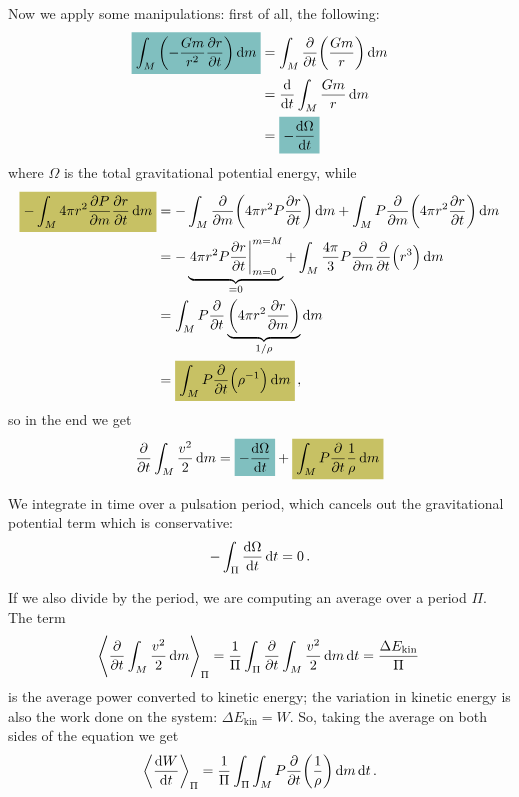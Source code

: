 \documentclass[main.tex]{subfiles}
\begin{document}
Now we apply some manipulations: first of all, the following: 
%
\begin{align}
\hlc{teal}{\int_{M} \qty(- \frac{Gm}{r^2} \pdv{r}{t}) \dd{m}} &= 
\int_{M} \pdv{}{t} \qty(\frac{Gm}{r}) \dd{m}  \\
&= \dv{}{t} \int_{M} \frac{Gm}{r} \dd{m}  \\
&= \hlc{teal}{- \dv{\Omega }{t}}
\,
\end{align}
%
where \(\Omega \) is the total gravitational potential energy, while 
%
\begin{align}
\hlc{olive}{- \int_{M} 4 \pi r^2 \pdv{P}{m} \pdv{r}{t} \dd{m}} &= 
- \int_{M} \pdv{}{m} \qty(4 \pi r^2 P \pdv{r}{t}) \dd{m}
+ \int_{M} P \pdv{}{m} \qty(4 \pi r^2 \pdv{r}{t}) \dd{m}  \\
&= - \underbrace{\eval{4 \pi r^2 P \pdv{r}{t}}_{m=0}^{m=M}}_{=0}
+ \int_{M} \frac{4 \pi }{3} P \pdv{}{m} \pdv{}{t} \qty(r^3) \dd{m}  \\
&= \int_{M} P \pdv{}{t} \underbrace{\qty(4 \pi r^2 \pdv{r}{m})}_{1 / \rho } \dd{m}  \\
&= \hlc{olive}{\int_{M} P \pdv{}{t} \qty(\rho^{-1}) \dd{m}}
\,,
\end{align}
%
so in the end we get 
%
\begin{equation}
\pdv{}{t} \int_M \frac{v^2}{2} \dd{m} =
\hlc{teal}{- \dv{\Omega}{t} } +
\hlc{olive}{\int_M P \pdv{}{t} \frac{1}{\rho} \dd{m}}
\end{equation}

We integrate in time over a pulsation period, which cancels out the gravitational potential term which is conservative: 
%
\begin{align}
-\int_{\Pi } \dv{\Omega }{t} \dd{t} = 0
\,.
\end{align}

If we also divide by the period, we are computing an average over a period \(\Pi \). The term 
%
\begin{align}
\expval{\pdv{}{t} \int_{M} \frac{v^2}{2} \dd{m}}_{\Pi }
= \frac{1}{\Pi } \int_{\Pi } \pdv{}{t} \int_{M} \frac{v^2}{2} \dd{m} \dd{t} = \frac{ \Delta E _{\text{kin}}}{\Pi }
\,
\end{align}
%
is the average power converted to kinetic energy; the variation in kinetic energy is also the work done on the system: \(\Delta E _{\text{kin}} = W\). So, taking the average on both sides of the equation we get
%
\begin{equation} \label{eq:driving-damping-layers-1}
\expval{\dv{W}{t}}_\Pi = \frac{1}{\Pi} \int_\Pi \int_M   P \pdv{}{t} \qty(\frac{1}{\rho}) \dd{m} \dd{t}.
\end{equation}
\end{document}
